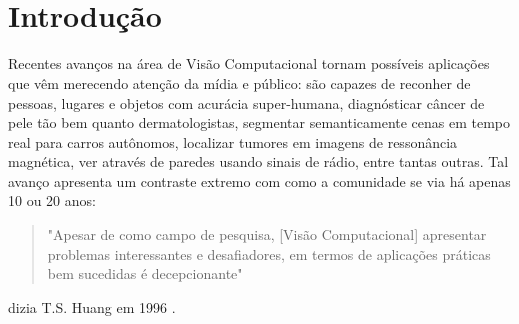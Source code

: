 \documentclass[
12pt, %
a4paper, %
onecolumn, %
]{article}
\begin{document}
\pagestyle{myheadings} %


\thispagestyle{plain} %

\printcover %

\begin{center}

  \horrule{0.5pt} \\[0.4cm] %

  \bigskip

  \textbf{\Large{\doctitle}}
  
  \bigskip
  
  \docauthor

  \bigskip
  

  \horrule{2pt} \\[0.5cm] %

\end{center}

\thispagestyle{plain}
\setcounter{page}{2}
\onehalfspacing

\section{Introdução}


Recentes avanços na área de Visão Computacional tornam possíveis aplicações que vêm merecendo atenção da mídia e público:  são capazes de reconher de pessoas, lugares e objetos com acurácia super-humana\cite{fei}, diagnósticar câncer de pele tão bem quanto dermatologistas\cite{fred}, segmentar semanticamente cenas em tempo real para carros autônomos, localizar tumores em imagens de ressonância magnética, ver através de paredes usando sinais de rádio, entre tantas outras. Tal avanço apresenta um contraste extremo com como a comunidade se via há apenas 10 ou 20 anos: 
\begin{quote}"Apesar de como campo de pesquisa, [Visão Computacional] apresentar problemas interessantes e desafiadores, em termos de aplicações práticas bem sucedidas é decepcionante"\end{quote} dizia T.S. Huang em 1996 \cite{huang1996}.  
\end{document}
